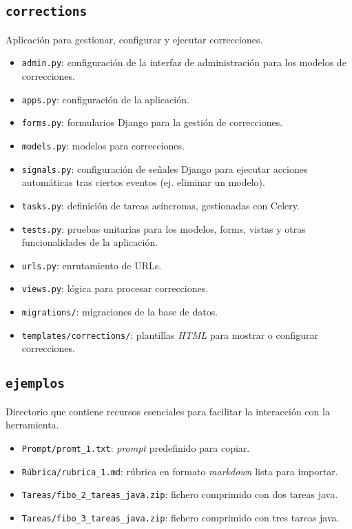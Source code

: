 \subsection{\texttt{corrections}}
Aplicación para gestionar, configurar y ejecutar correcciones.

\begin{itemize}
    \item \texttt{admin.py}: configuración de la interfaz de administración para los modelos de correcciones.
    \item \texttt{apps.py}: configuración de la aplicación.
    \item \texttt{forms.py}: formularios Django para la gestión de correcciones.
    \item \texttt{models.py}: modelos para correcciones.
    \item \texttt{signals.py}: configuración de señales Django para ejecutar acciones automáticas tras ciertos eventos (ej. eliminar un modelo).
    \item \texttt{tasks.py}: definición de tareas asíncronas, gestionadas con Celery.
    \item \texttt{tests.py}: pruebas unitarias para los modelos, forms, vistas y otras funcionalidades de la aplicación.
    \item \texttt{urls.py}: enrutamiento de URLs.
    \item \texttt{views.py}: lógica para procesar correcciones.
    \item \texttt{migrations/}: migraciones de la base de datos.
    \item \texttt{templates/corrections/}: plantillas \textit{HTML} para mostrar o configurar correcciones.
\end{itemize}

\subsection{\texttt{ejemplos}}
Directorio que contiene recursos esenciales para facilitar la interacción con la herramienta.

\begin{itemize}
    \item \texttt{Prompt/promt\_1.txt}: \textit{prompt} predefinido para copiar.
    \item \texttt{Rúbrica/rubrica\_1.md}: rúbrica en formato \textit{markdown} lista para importar.
    \item \texttt{Tareas/fibo\_2\_tareas\_java.zip}: fichero comprimido con dos tareas java.
    \item \texttt{Tareas/fibo\_3\_tareas\_java.zip}: fichero comprimido con tres tareas java.
\end{itemize}

